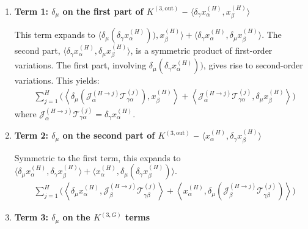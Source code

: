 \documentclass[11pt,a4paper]{article}
\theoremstyle{definition}
\begin{document}
\begin{enumerate}
    \item \textbf{Term 1: $\delta_\mu$ on the first part of $K^{(3, \text{out})}$ -- $\langle \delta_\gamma x^{(H)}_\alpha, x^{(H)}_\beta \rangle$}
    
    This term expands to $\langle \delta_\mu(\delta_\gamma x^{(H)}_\alpha)), x^{(H)}_\beta \rangle + \langle \delta_\gamma x^{(H)}_\alpha, \delta_\mu x^{(H)}_\beta \rangle$. The second part, $\langle \delta_\gamma x^{(H)}_\alpha, \delta_\mu x^{(H)}_\beta \rangle$, is a symmetric product of first-order variations. The first part, involving $\delta_\mu(\delta_\gamma x^{(H)}_\alpha))$, gives rise to second-order variations. This yields:
    \begin{align}
    & \sum_{j=1}^{H} \Biggl( \left\langle \delta_\mu \left( \mathcal{J}^{(H \to j)}_{\alpha} \mathcal{T}^{(j)}_{\gamma\alpha} \right), x^{(H)}_\beta \right\rangle + \left\langle \mathcal{J}^{(H \to j)}_{\alpha} \mathcal{T}^{(j)}_{\gamma\alpha}, \delta_\mu x^{(H)}_\beta \right\rangle \Biggr)
    \end{align}
    where $\mathcal{J}^{(H \to j)}_{\alpha} \mathcal{T}^{(j)}_{\gamma\alpha} = \delta_\gamma x^{(H)}_\alpha$.

    \item \textbf{Term 2: $\delta_\mu$ on the second part of $K^{(3, \text{out})}$ -- $\langle x^{(H)}_\alpha, \delta_\gamma x^{(H)}_\beta \rangle$}
    
    Symmetric to the first term, this expands to $\langle \delta_\mu x^{(H)}_\alpha, \delta_\gamma x^{(H)}_\beta \rangle + \langle x^{(H)}_\alpha, \delta_\mu(\delta_\gamma x^{(H)}_\beta) \rangle$.
    \begin{align}
    & \sum_{j=1}^{H} \Biggl( \left\langle \delta_\mu x^{(H)}_\alpha, \mathcal{J}^{(H \to j)}_{\beta} \mathcal{T}^{(j)}_{\gamma\beta} \right\rangle + \left\langle x^{(H)}_\alpha, \delta_\mu \left( \mathcal{J}^{(H \to j)}_{\beta} \mathcal{T}^{(j)}_{\gamma\beta} \right) \right\rangle \Biggr)
    \end{align}

    \item \textbf{Term 3: $\delta_\mu$ on the $K^{(3, G)}$ terms}


\end{enumerate}
\end{document}
